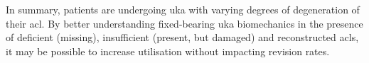 In summary, patients are undergoing \gls{uka} with varying degrees of degeneration of their \gls{acl}.
By better understanding fixed-bearing \gls{uka} biomechanics in the presence of deficient (missing), insufficient (present, but damaged) and reconstructed \gls{acl}s, it may be possible to increase utilisation without impacting revision rates. 

%
%


%
%

